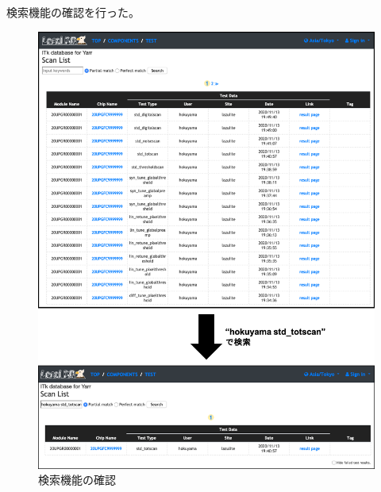 検索機能の確認を行った。
\begin{figure}[bpt]\centering
\includegraphics[width=12cm]{demo_search_function}
\caption[検索機能の確認]{検索機能の確認}
\label{demo_search_function}
\end{figure}

\clearpage
